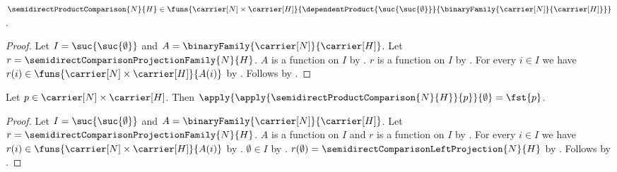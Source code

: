 \begin{proposition}\label{semidirect_product_comparison_type}
    $\semidirectProductComparison{N}{H}\in
        \funs{\carrier[N]\times\carrier[H]}
            {\dependentProduct
                {\suc{\suc{\emptyset}}}
                {\binaryFamily{\carrier[N]}{\carrier[H]}}}$.
\end{proposition}
\begin{proof}
    Let $I=\suc{\suc{\emptyset}}$ and
        $A=\binaryFamily{\carrier[N]}{\carrier[H]}$.
    Let $r=\semidirectComparisonProjectionFamily{N}{H}$.
    $A$ is a function on $I$ by
        .
    $r$ is a function on $I$ by
        .
    For every $i\in I$ we have
        $r(i)\in\funs{\carrier[N]\times\carrier[H]}{A(i)}$ by
        .
    Follows by
        .
\end{proof}

\begin{proposition}\label{semidirect_product_comparison_left}
    Let $p\in\carrier[N]\times\carrier[H]$.
    Then
        $\apply{\apply{\semidirectProductComparison{N}{H}}{p}}
            {\emptyset}=\fst{p}$.
\end{proposition}
\begin{proof}
    Let $I=\suc{\suc{\emptyset}}$ and
        $A=\binaryFamily{\carrier[N]}{\carrier[H]}$.
    Let $r=\semidirectComparisonProjectionFamily{N}{H}$.
    $A$ is a function on $I$ and $r$ is a function on $I$ by
        .
    For every $i\in I$ we have
        $r(i)\in\funs{\carrier[N]\times\carrier[H]}{A(i)}$ by
        .
    $\emptyset\in I$ by .
    $r(\emptyset)=\semidirectComparisonLeftProjection{N}{H}$ by
        .
    Follows by
        .
\end{proof}

